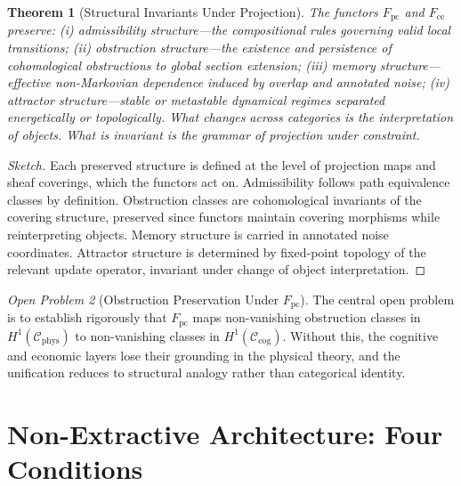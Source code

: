 \documentclass[11pt]{article}
\theoremstyle{plain}
\newtheorem{theorem}{Theorem}[section]
\theoremstyle{definition}
\theoremstyle{remark}
\newtheorem{openproblem}[theorem]{Open Problem}
\newcommand{\Fpc}{F_{\mathrm{pc}}}
\newcommand{\Fce}{F_{\mathrm{ce}}}
\newcommand{\Hone}{H^1}
\begin{document}
\begin{theorem}[Structural Invariants Under Projection]
The functors $\Fpc$ and $\Fce$ preserve: (i) admissibility structure---the
compositional rules governing valid local transitions; (ii) obstruction
structure---the existence and persistence of cohomological obstructions to
global section extension; (iii) memory structure---effective non-Markovian
dependence induced by overlap and annotated noise; (iv) attractor
structure---stable or metastable dynamical regimes separated energetically
or topologically. What changes across categories is the interpretation of
objects. What is invariant is the grammar of projection under constraint.
\end{theorem}

\begin{proof}[Sketch]
Each preserved structure is defined at the level of projection maps and
sheaf coverings, which the functors act on. Admissibility follows path
equivalence classes by definition. Obstruction classes are cohomological
invariants of the covering structure, preserved since functors maintain
covering morphisms while reinterpreting objects. Memory structure is
carried in annotated noise coordinates. Attractor structure is determined
by fixed-point topology of the relevant update operator, invariant under
change of object interpretation.
\end{proof}

\begin{openproblem}[Obstruction Preservation Under $\Fpc$]
The central open problem is to establish rigorously that $\Fpc$ maps
non-vanishing obstruction classes in $\Hone(\mathcal{C}_{\mathrm{phys}})$
to non-vanishing classes in $\Hone(\mathcal{C}_{\mathrm{cog}})$. Without
this, the cognitive and economic layers lose their grounding in the physical
theory, and the unification reduces to structural analogy rather than
categorical identity.
\end{openproblem}

\section{Non-Extractive Architecture: Four Conditions}
\end{document}
